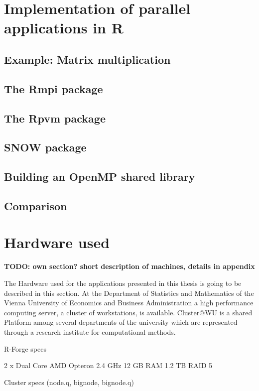 \section{Implementation of parallel applications in R}
\label{sec:parallel_R}

\subsection{Example: Matrix multiplication}
\subsection{The Rmpi package}
\subsection{The Rpvm package}
\subsection{SNOW package}
\subsection{Building an OpenMP shared library}
\subsection{Comparison}

\section{Hardware used}

\textbf{TODO: own section? short description of machines, details in
  appendix}

The Hardware used for the applications presented in this thesis is
going to be described in this section.
At the Department of Statistics and Mathematics of the Vienna
University of Economics and Business Administration a high performance
computing server, a cluster of workstations, is
available. Cluster@WU is a shared Platform among several departments
of the university which are represented through a research institute
for computational methods. 
\begin{table}

\end{table}
R-Forge specs

2 x Dual Core AMD Opteron 2.4 GHz
12 GB RAM
1.2 TB RAID 5

Cluster specs (node.q, bignode, bignode.q)

